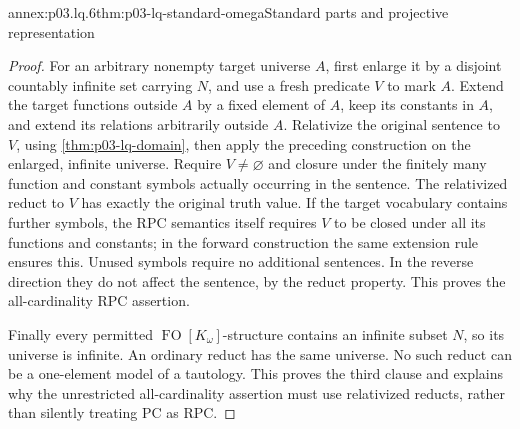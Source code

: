\begin{annexitem}{annex:p03.lq.6}{thm:p03-lq-standard-omega}{Standard parts and projective representation}
\begin{proof}
For an arbitrary nonempty target universe \(A\), first enlarge
it by a disjoint countably infinite set carrying \(N\), and use
a fresh predicate \(V\) to mark \(A\). Extend the target
functions outside \(A\) by a fixed element of \(A\), keep its
constants in \(A\), and extend its relations arbitrarily outside
\(A\). Relativize the original sentence to \(V\), using
\cref{thm:p03-lq-domain}, then apply the preceding construction
on the enlarged, infinite universe. Require \(V\ne\varnothing\)
and closure under the finitely many function and constant symbols
actually occurring in the sentence. The relativized reduct to
\(V\) has exactly the original truth value.
If the target vocabulary contains further symbols, the RPC
semantics itself requires \(V\) to be closed under all its
functions and constants; in the forward construction the same
extension rule ensures this. Unused symbols require no additional
sentences. In the reverse direction they do not affect the
sentence, by the reduct property. This proves the all-cardinality
RPC assertion.

Finally every permitted \(\operatorname{FO}[K_\omega]\)-structure
contains an infinite subset \(N\), so its universe is infinite.
An ordinary reduct has the same universe. No such reduct can be
a one-element model of a tautology. This proves the third clause
and explains why the unrestricted all-cardinality assertion must
use relativized reducts, rather than silently treating PC as RPC.
\end{proof}
\end{annexitem}

